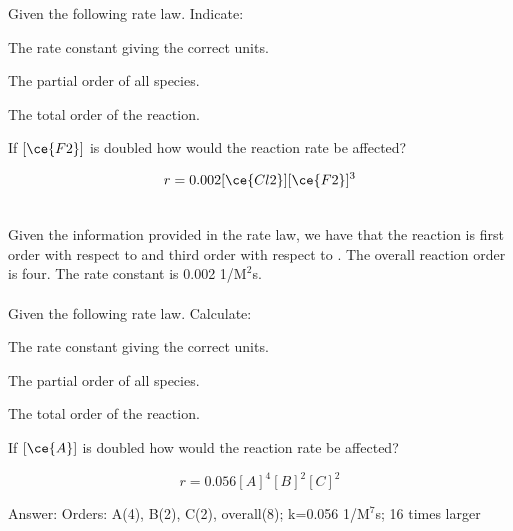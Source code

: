 \documentclass[main.tex]{subfiles}
\begin{document}
\begin{description}
\begin{example} %
Given the following rate law. Indicate:
\begin{inparaenum}[(a)]	
\item The rate constant giving the correct units.
\item	 The partial order of all species.
\item  The total order of the reaction.
\item  If $[\ce{F2}]$ is doubled how would the reaction rate be affected?
\end{inparaenum} 
\begin{center}\[r=0.002[\ce{Cl2}][\ce{F2}]^3\]\end{center}
\\
Given the information provided in the rate law, we have that the reaction is first order with respect to  and third order with respect to . The overall reaction order is four. The rate constant is 0.002 1/$\text{M}^2$s.
\\\faDiamond\ \\
Given the following rate law. Calculate:
\begin{inparaenum}[(a)]	
\item The rate constant giving the correct units.
\item	 The partial order of all species.
\item  The total order of the reaction.
\item  If $[\ce{A}]$ is doubled how would the reaction rate be affected?
\end{inparaenum} 
\begin{center}\[r=0.056[A]^4[B]^2[C]^2\]\end{center}
\flushright Answer:   Orders: A(4), B(2), C(2), overall(8); k=0.056 1/$\text{M}^7$s; 16 times larger
\end{example}%


\end{description}
\end{document}
